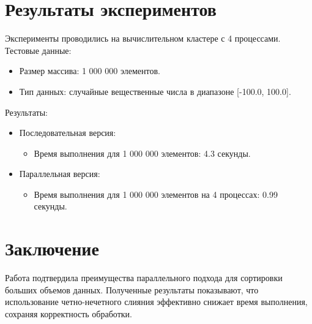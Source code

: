 \documentclass[a4paper,12pt]{article}
\begin{document}
\newpage

\section*{\centering Результаты экспериментов}

Эксперименты проводились на вычислительном кластере с 4 процессами. Тестовые данные:
\begin{itemize}
    \item Размер массива: 1 000 000 элементов.
    \item Тип данных: случайные вещественные числа в диапазоне [-100.0, 100.0].
\end{itemize}

Результаты:
\begin{itemize}
    \item Последовательная версия:
    \begin{itemize}
        \item Время выполнения для 1 000 000 элементов: 4.3 секунды.
    \end{itemize}
    \item Параллельная версия:
    \begin{itemize}
        \item Время выполнения для 1 000 000 элементов на 4 процессах: 0.99 секунды.
    \end{itemize}
\end{itemize}

\newpage

\section*{\centering Заключение}

Работа подтвердила преимущества параллельного подхода для сортировки больших объемов данных. Полученные результаты показывают, что использование четно-нечетного слияния эффективно снижает время выполнения, сохраняя корректность обработки.

\newpage
\end{document}
